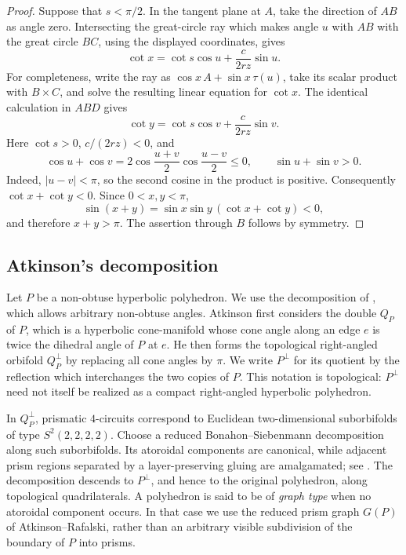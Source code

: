 \documentclass[12pt,a4paper]{article}
\theoremstyle{definition}
\begin{document}
\begin{proof}
Suppose that \(s<\pi/2\). In the tangent plane at \(A\), take the direction
of \(AB\) as angle zero. Intersecting the great-circle ray which makes angle
\(u\) with \(AB\) with the great circle \(BC\), using the displayed
coordinates, gives
\[
        \cot x=\cot s\cos u+\frac{c}{2rz}\sin u.
\]
For completeness, write the ray as
\(\cos x\,A+\sin x\,\tau(u)\), take its scalar product with \(B\times C\),
and solve the resulting linear equation for \(\cot x\).
The identical calculation in \(ABD\) gives
\[
        \cot y=\cot s\cos v+\frac{c}{2rz}\sin v.
\]
Here \(\cot s>0\), \(c/(2rz)<0\), and
\[
 \cos u+\cos v
 =2\cos\frac{u+v}{2}\cos\frac{u-v}{2}\le0,
 \qquad
 \sin u+\sin v>0.
\]
Indeed, \(|u-v|<\pi\), so the second cosine in the product is positive.
Consequently \(\cot x+\cot y<0\). Since \(0<x,y<\pi\),
\[
 \sin(x+y)=\sin x\sin y\,(\cot x+\cot y)<0,
\]
and therefore \(x+y>\pi\). The assertion through \(B\) follows by symmetry.
\end{proof}

\subsection{Atkinson's decomposition}

Let \(P\) be a non-obtuse hyperbolic polyhedron. We use the decomposition
of \cite[Section~4]{Atkinson2011}, which allows arbitrary non-obtuse angles.
Atkinson first considers the double \(Q_P\) of \(P\), which is a hyperbolic
cone-manifold whose cone angle along an edge \(e\) is twice the dihedral angle
of \(P\) at \(e\).  He then forms the topological right-angled orbifold
\(Q_P^\perp\) by replacing all cone angles by \(\pi\).  We write \(P^\perp\)
for its quotient by the reflection which interchanges the two copies of
\(P\).  This notation is topological: \(P^\perp\) need not itself be realized
as a compact right-angled hyperbolic polyhedron.

In \(Q_P^\perp\), prismatic \(4\)-circuits correspond to Euclidean
two-dimensional suborbifolds of type \(S^2(2,2,2,2)\).  Choose a reduced
Bonahon--Siebenmann decomposition along such
suborbifolds. Its atoroidal components are canonical, while adjacent prism
regions separated by a layer-preserving gluing are amalgamated; see
\cite[Sections~4.2 and 6.4]{Atkinson2011}. The decomposition descends to
\(P^\perp\), and hence to the original polyhedron, along topological
quadrilaterals. A polyhedron is said to be of \emph{graph type} when no
atoroidal component occurs. In that case we use the reduced prism graph
\(G(P)\) of Atkinson--Rafalski, rather than an arbitrary visible subdivision
of the boundary of \(P\) into prisms.
\end{document}
